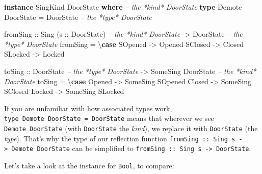 \documentclass[]{article}
\newenvironment{Shaded}{}{}
\newcommand{\KeywordTok}[1]{\textcolor[rgb]{0.00,0.44,0.13}{\textbf{#1}}}
\newcommand{\DataTypeTok}[1]{\textcolor[rgb]{0.56,0.13,0.00}{#1}}
\newcommand{\CommentTok}[1]{\textcolor[rgb]{0.38,0.63,0.69}{\textit{#1}}}
\newcommand{\OtherTok}[1]{\textcolor[rgb]{0.00,0.44,0.13}{#1}}
\newcommand{\FunctionTok}[1]{\textcolor[rgb]{0.02,0.16,0.49}{#1}}
\newcommand{\NormalTok}[1]{#1}
\begin{document}
\begin{Shaded}
\begin{Highlighting}[]
\KeywordTok{instance} \DataTypeTok{SingKind} \DataTypeTok{DoorState} \KeywordTok{where}       \CommentTok{-- the *kind* DoorState}
    \KeywordTok{type} \DataTypeTok{Demote} \DataTypeTok{DoorState} \FunctionTok{=} \DataTypeTok{DoorState}   \CommentTok{-- the *type* DoorState}

\NormalTok{    fromSing}
\OtherTok{        ::} \DataTypeTok{Sing}\NormalTok{ (}\OtherTok{s ::} \DataTypeTok{DoorState}\NormalTok{)        }\CommentTok{-- the *kind* DoorState}
        \OtherTok{->} \DataTypeTok{DoorState}                    \CommentTok{-- the *type* DoorState}
\NormalTok{    fromSing }\FunctionTok{=}\NormalTok{ \textbackslash{}}\KeywordTok{case}
        \DataTypeTok{SOpened} \OtherTok{->} \DataTypeTok{Opened}
        \DataTypeTok{SClosed} \OtherTok{->} \DataTypeTok{Closed}
        \DataTypeTok{SLocked} \OtherTok{->} \DataTypeTok{Locked}

\NormalTok{    toSing}
\OtherTok{        ::} \DataTypeTok{DoorState}                    \CommentTok{-- the *type* DoorState}
        \OtherTok{->} \DataTypeTok{SomeSing} \DataTypeTok{DoorState}           \CommentTok{-- the *kind* DoorState}
\NormalTok{    toSing }\FunctionTok{=}\NormalTok{ \textbackslash{}}\KeywordTok{case}
        \DataTypeTok{Opened} \OtherTok{->} \DataTypeTok{SomeSing} \DataTypeTok{SOpened}
        \DataTypeTok{Closed} \OtherTok{->} \DataTypeTok{SomeSing} \DataTypeTok{SClosed}
        \DataTypeTok{Locked} \OtherTok{->} \DataTypeTok{SomeSing} \DataTypeTok{SLocked}
\end{Highlighting}
\end{Shaded}

If you are unfamiliar with how associated types work,
\texttt{type\ Demote\ DoorState\ =\ DoorState} means that wherever we see
\texttt{Demote\ DoorState} (with \texttt{DoorState} the \emph{kind}), we replace
it with \texttt{DoorState} (the \emph{type}). That's why the type of our
reflection function
\texttt{fromSing\ ::\ Sing\ s\ -\textgreater{}\ Demote\ DoorState} can be
simplified to \texttt{fromSing\ ::\ Sing\ s\ -\textgreater{}\ DoorState}.

Let's take a look at the instance for \texttt{Bool}, to compare:
\end{document}
